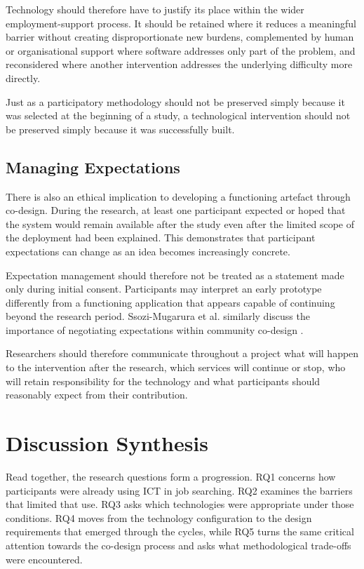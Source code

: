 Technology should therefore have to justify its place within the wider employment-support process. It should be retained where it reduces a meaningful barrier without creating disproportionate new burdens, complemented by human or organisational support where software addresses only part of the problem, and reconsidered where another intervention addresses the underlying difficulty more directly.

Just as a participatory methodology should not be preserved simply because it was selected at the beginning of a study, a technological intervention should not be preserved simply because it was successfully built.


\subsection{Managing Expectations}

There is also an ethical implication to developing a functioning artefact through co-design. During the research, at least one participant expected or hoped that the system would remain available after the study even after the limited scope of the deployment had been explained. This demonstrates that participant expectations can change as an idea becomes increasingly concrete.

Expectation management should therefore not be treated as a statement made only during initial consent. Participants may interpret an early prototype differently from a functioning application that appears capable of continuing beyond the research period. Ssozi-Mugarura et al. similarly discuss the importance of negotiating expectations within community co-design \cite{ssozi2017}.

Researchers should therefore communicate throughout a project what will happen to the intervention after the research, which services will continue or stop, who will retain responsibility for the technology and what participants should reasonably expect from their contribution.


\section{Discussion Synthesis}

Read together, the research questions form a progression. RQ1 concerns how participants were already using ICT in job searching. RQ2 examines the barriers that limited that use. RQ3 asks which technologies were appropriate under those conditions. RQ4 moves from the technology configuration to the design requirements that emerged through the cycles, while RQ5 turns the same critical attention towards the co-design process and asks what methodological trade-offs were encountered.

